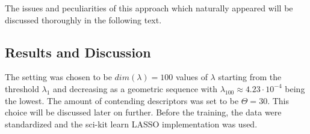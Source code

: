 \documentclass[11pt,oneside,czech,american]{book} %
\theoremstyle{plain}
\theoremstyle{definition}
\begin{document}

The issues and peculiarities of this approach which naturally appeared will be discussed thoroughly in the following text.


\subsection{Results and Discussion}
The setting was chosen to be $dim(\lambda)=100$ values of $\lambda$ starting from the threshold $\lambda_1$ and decreasing as a geometric sequence with $\lambda_{100} \approx 4.23 \cdot 10^{-4}$ being the lowest. The amount of contending descriptors was set to be $\Theta = 30$. This choice will be discussed later on further. Before the training, the data were standardized and the sci-kit learn \parencite{scikit-learn} LASSO implementation was used.
\end{document}
